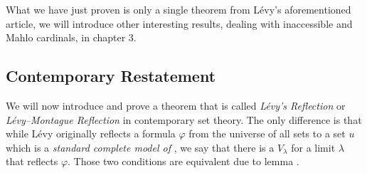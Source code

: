 What we have just proven is only a single theorem from Lévy's aforementioned article, we will introduce other interesting results, dealing with inaccessible and Mahlo cardinals, in chapter 3.


\subsection{Contemporary Restatement}
We will now introduce and prove a theorem that is called \emph{Lévy's Reflection} or \emph{Lévy–Montague Reflection} in contemporary set theory. The only difference is that while Lévy originally reflects a formula $\varphi$ from the universe of all sets to a set $u$ which is a \emph{standard complete model of }, we say that there is a $V_\lambda$ for a limit $\lambda$ that reflects $\varphi$. Those two conditions are equivalent due to lemma .





